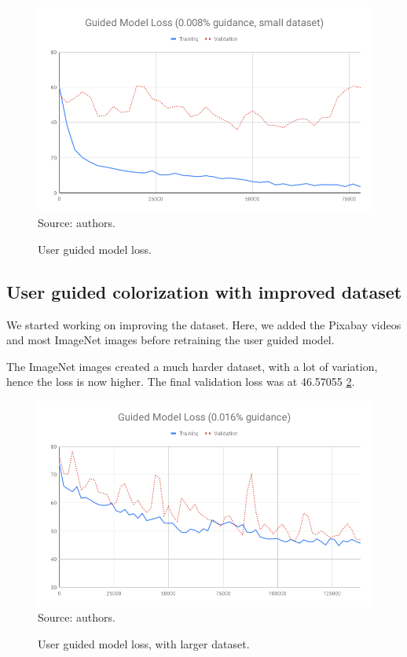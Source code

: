 \documentclass[12pt,openright,oneside,a4paper,english, brazilian]{abntex2}
\begin{document}
\begin{otherlanguage}{english}
\begin{figure}[!htb]
\centering
\caption{User guided model loss.}
\includegraphics[width=\textwidth]{loss/Guided_0_008}
Source: authors.
\label{loss_0_008}
\end{figure}

\subsection{User guided colorization with improved dataset}

We started working on improving the dataset. Here, we added the Pixabay videos and most ImageNet images before retraining the user guided model.

The ImageNet images created a much harder dataset, with a lot of variation, hence the loss is now higher. The final validation loss was at 46.57055 \ref{loss_0_016}.

\begin{figure}[!htb]
\centering
\caption{User guided model loss, with larger dataset.}
\includegraphics[width=\textwidth]{loss/Guided_0_016}
Source: authors.
\label{loss_0_016}
\end{figure}


\end{otherlanguage}
\end{document}
